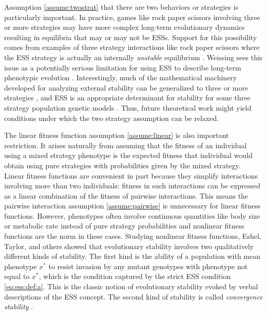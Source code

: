 \documentclass[11pt]{article}
\newcommand{\ess}[1]{#1^*}
\begin{document}
Assumption \ref{assume:twostrat} that there are two behaviors or strategies is particularly important. In practice, games like rock paper scissors \cite{Taylor:Jonker:1978,Zeeman:1980,Weissing:1991,Hofbauer:Sigmund:1998} involving three or more strategies may have more complex long-term evolutionary dynamics resulting in equilibria that may or may not be ESSs. Support for this possibility comes from examples of three strategy interactions like rock paper scissors where the ESS strategy is actually an internally \textit{unstable} equilibrium \cites{Friedman:1991,Weissing:1991}. Weissing sees this issue as a potentially serious limitation for using ESS to describe long-term phenotypic evolution \cite{Weissing:1996}.
Interestingly, much of the mathematical machinery developed for analyzing external stability can be generalized to three or more strategies \cite[e.g.,][]{Eshel:Feldman:1984,Weissing:1996,Eshel:Feldman:1998,Hofbauer:Sigmund:1998}, and ESS is an appropriate determinant for stability for some three strategy population genetic models \cite[e.g., single-locus three-allele models in continuous time][]{Cressman:Hofbauer:1996}. Thus, future theoretical work might yield conditions under which the two strategy assumption can be relaxed.

The linear fitness function assumption \ref{assume:linear} is also important restriction. It arises naturally from assuming that the fitness of an individual using a mixed strategy phenotype is the expected fitness that individual would obtain using pure strategies with probabilities given by the mixed strategy. Linear fitness functions are convenient in part because they simplify interactions involving more than two individuals: fitness in such interactions can be expressed as a linear combination of the fitness of pairwise interactions. This means the pairwise interaction assumption \ref{assume:pairwise} is unnecessary for linear fitness functions. However, phenotypes often involve continuous quantities like body size or metabolic rate instead of pure strategy probabilities and nonlinear fitness functions are the norm in these cases. Studying nonlinear fitness functions, Eshel, Taylor, and others \cite{Eshel:Motro:1981,Eshel:1983,Taylor:1989,Christiansen:1991,Metz:Geritz:1996,Eshel:Motro:1997,Geritz:Kisdi:1998} showed that evolutionary stability involves two qualitatively different kinds of stability. The first kind is the ability of a population with mean phenotype $\ess{x}$ to resist invasion by any mutant genotypes with phenotype not equal to $\ess{x}$, which is the condition captured by the strict ESS condition \eqref{eq:ess:def:a}. This is the classic notion of evolutionary stability evoked by verbal descriptions of the ESS concept. The second kind of stability is called \textit{convergence stability} \cite{Christiansen:1991,Eshel:1996,Geritz:Kisdi:1998}.
\end{document}
